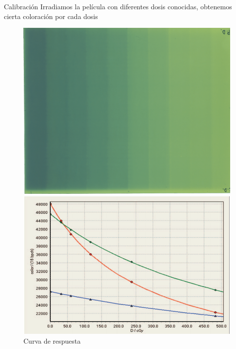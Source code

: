 \documentclass[12pt]{beamer}
\begin{document}
\begin{frame}{Calibración}
	Irradiamos la película con diferentes dosis conocidas, obtenemos cierta coloración por cada dosis
	\begin{figure}
		\centering
		\begin{minipage}{0.45\textwidth}
			\includegraphics[width=\textwidth]{images/calibracionSimpleLandscape.png}
			\caption{Película de calibración}
		\end{minipage}\hfill
		\begin{minipage}{0.45\textwidth}
			\includegraphics[width=\textwidth]{images/respses.png}
			\caption{Curva de respuesta\cite{Rink2008}}
		\end{minipage}
	\end{figure}
\end{frame}
\end{document}
